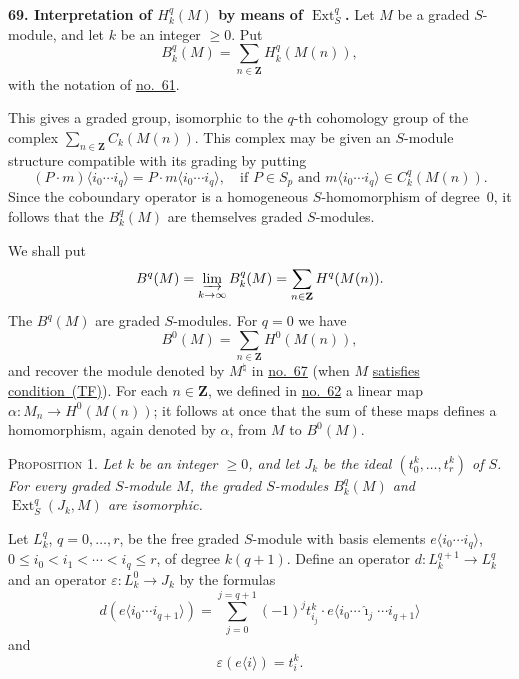 
\label{fac:III:4:no:69}
\textbf{69. Interpretation of $H_k^q(M)$ by means of
$\operatorname{Ext}_S^q$.}
Let $M$ be a graded $S$-module, and let $k$ be an integer $\geq0$. Put
\label{fac:III:4:no:69:def:Bk}
\[
B_k^q(M)=\sum_{n\in\mathbf{Z}}H_k^q(M(n)),
\]
with the notation of \hyperref[fac:III:3:no:61]{no.~61}.

This gives a graded group, isomorphic to the $q$-th cohomology group of
the complex $\sum_{n\in\mathbf{Z}}C_k(M(n))$. This complex may be given
an $S$-module structure compatible with its grading by putting
\label{fac:III:4:no:69:formula:S-action}
\[
(P\cdot m)\langle i_0\cdots i_q\rangle
=P\cdot m\langle i_0\cdots i_q\rangle,
\quad\text{if }P\in S_p\text{ and }
m\langle i_0\cdots i_q\rangle\in C_k^q(M(n)).
\]
Since the coboundary operator is a homogeneous $S$-homomorphism of
degree~$0$, it follows that the $B_k^q(M)$ are themselves graded
$S$-modules.

We shall put
\label{fac:III:4:no:69:def:Bq}
\[
B^q(M)=\varinjlim_{k\to\infty}B_k^q(M)
=\sum_{n\in\mathbf{Z}}H^q(M(n)).
\]
The $B^q(M)$ are graded $S$-modules. For $q=0$ we have
\label{fac:III:4:no:69:formula:B0}
\[
B^0(M)=\sum_{n\in\mathbf{Z}}H^0(M(n)),
\]
and recover the module denoted by
\hyperref[fac:III:3:no:67:def:M-natural]{$M^\natural$} in
\hyperref[fac:III:3:no:67]{no.~67} (when $M$
\hyperref[fac:III:2:no:56:def:TF]{satisfies condition~(TF)}).
\label{fac:III:4:no:69:map:alpha}
For each $n\in\mathbf{Z}$, we defined in
\hyperref[fac:III:3:no:62:def:alpha]{no.~62} a linear map
$\alpha:M_n\longrightarrow H^0(M(n))$; it follows at once that the sum
of these maps defines a homomorphism, again denoted by $\alpha$, from
$M$ to $B^0(M)$.

\label{fac:III:4:no:69:prop:1}
\textsc{Proposition 1.} \textit{Let $k$ be an integer $\geq0$, and let
$J_k$ be the ideal $(t_0^k,\ldots,t_r^k)$ of $S$. For every graded
$S$-module $M$, the graded $S$-modules $B_k^q(M)$ and
$\operatorname{Ext}_S^q(J_k,M)$ are isomorphic.}

\label{fac:III:4:no:69:def:Lk}
Let $L_k^q$, $q=0,\ldots,r$, be the free graded $S$-module with basis
elements $e\langle i_0\cdots i_q\rangle$,
$0\leq i_0<i_1<\cdots<i_q\leq r$, of degree $k(q+1)$. Define an
operator $d:L_k^{q+1}\longrightarrow L_k^q$ and an operator
$\varepsilon:L_k^0\longrightarrow J_k$ by the formulas
\label{fac:III:4:no:69:formula:d}
\[
d(e\langle i_0\cdots i_{q+1}\rangle)
=\sum_{j=0}^{j=q+1}(-1)^j t_{i_j}^k\cdot
e\langle i_0\cdots\widehat{\imath}_j\cdots i_{q+1}\rangle
\]
and
\label{fac:III:4:no:69:formula:augmentation}
\[
\varepsilon(e\langle i\rangle)=t_i^k.
\]

